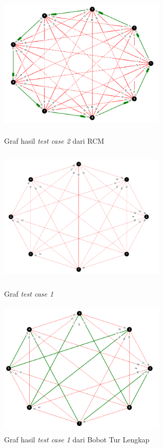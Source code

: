 \documentclass{article}
\begin{document}
	\begin{figure}[htbp]
	\centering
	\includegraphics[width=8cm, height=6.5cm]{tc2.png}
	\caption{Graf hasil \textit{test case 2} dari RCM}
	\includegraphics[width=8cm, height=6.5cm]{tc3_i.png}
	\caption{Graf \textit{test case 1}}
	\includegraphics[width=8cm, height=6.5cm]{tc3.png}
	\caption{Graf hasil \textit{test case 1} dari Bobot Tur Lengkap}
	\end{figure}
	
\end{document}
